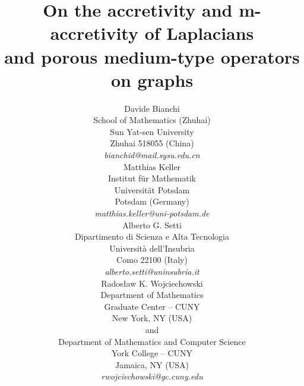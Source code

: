 \documentclass[letterpaper]{article}
\theoremstyle{definition}
\theoremstyle{named}
\numberwithin{equation}{section}
\begin{document}
\title{On the accretivity and m-accretivity of Laplacians\\ and porous medium-type operators on graphs}
\date{}
\author{Davide Bianchi\\
	School of Mathematics (Zhuhai)\\
	Sun Yat-sen University\\
	Zhuhai 518055 (China)\\
    \textit{bianchid@mail.sysu.edu.cn}\\
\And
Matthias Keller \\
Institut für Mathematik\\
Universität Potsdam \\
    Potsdam (Germany)\\
\textit{matthias.keller@uni-potsdam.de}\\
\And
Alberto G. Setti\\
Dipartimento di Scienza e Alta Tecnologia\\
	Universit\`a dell'Insubria\\
	Como 22100 (Italy)\\
\textit{alberto.setti@uninsubria.it}\\
\And
Rados{\l}aw K. Wojciechowski\\
Department of Mathematics
	\\
	Graduate Center -- CUNY \\
    New York, NY (USA)\\
    and \\
Department of Mathematics and Computer Science
	\\
	York College -- CUNY\\
    Jamaica, NY (USA)\\
\textit{rwojciechowski@gc.cuny.edu}
}

\setcounter{tocdepth}{2}





\maketitle
\end{document}
